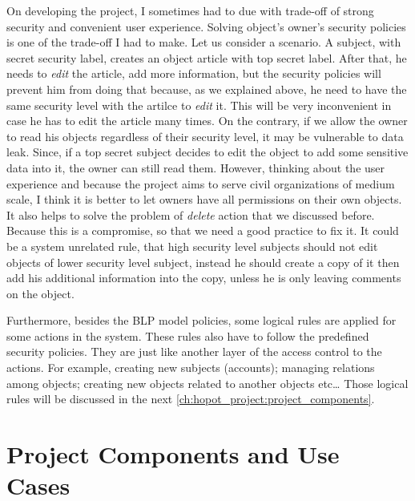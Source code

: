 On developing the project, I sometimes had to due with trade-off of strong security and convenient user experience.
Solving object's owner's security policies is one of the trade-off I had to make.
Let us consider a scenario.
A subject, with secret security label, creates an object \eg article with top secret label. 
After that, he needs to \emph{edit} the article, \eg add more information, but the security policies will prevent him from doing that because, as we explained above, he need to have the same security level with the artilce to \emph{edit} it.
This will be very inconvenient in case he has to edit the article many times.
On the contrary, if we allow the owner to read his objects regardless of their security level, it may be vulnerable to data leak.
Since, if a top secret subject decides to edit the object to add some sensitive data into it, the owner can still read them.
However, thinking about the user experience and because the project aims to serve civil organizations of medium scale, I think it is better to let owners have all permissions on their own objects.
It also helps to solve the problem of \emph{delete} action that we discussed before.
Because this is a compromise, so that we need a good practice to fix it.
It could be a system unrelated rule, that high security level subjects should not edit objects of lower security level subject, instead he should create a copy of it then add his additional information into the copy, unless he is only leaving comments on the object.

Furthermore, besides the BLP model policies, some logical rules are applied for some actions in the system.
These rules also have to follow the predefined security policies.
They are just like another layer of the access control to the actions.
For example, creating new subjects (accounts); managing relations among objects; creating new objects related to another objects etc\dots
Those logical rules will be discussed in the next \autoref{ch:hopot_project:project_components}.

\section{Project Components and Use Cases}
\label{ch:hopot_project:project_components}

